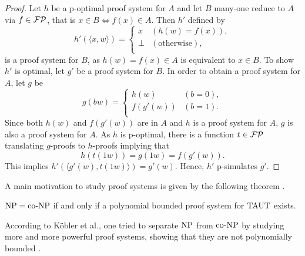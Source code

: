   \begin{proof}
    Let \(h\) be a p-optimal proof system for \(A\) and let \(B\) many-one reduce to \(A\) via \(f \in \mathcal{FP}\), that is \(x \in B \Leftrightarrow f(x) \in A\). Then \(h'\) defined by
      \[ 
        h'(\langle x, w \rangle) =
        \begin{cases}
          x & (h(w) = f(x)), \\
          \perp & (\text{otherwise}), \\
        \end{cases}
      \]
    is a proof system for \(B\), as \(h(w) = f(x) \in A\) is equivalent to \(x \in B\). To show \(h'\) is optimal, let \(g'\) be a proof system for \(B\). In order to obtain a proof system for \(A\), let \(g\) be
      \[
        g(bw) =
        \begin{cases}
          h(w) & (b = 0), \\
          f(g'(w)) & (b = 1). \\
        \end{cases}
      \]
    Since both \(h(w)\) and \(f(g'(w))\) are in \(A\) and \(h\) is a proof system for \(A\), \(g\) is also a proof system for \(A\). As \(h\) is p-optimal, there is a function \(t \in \mathcal{FP}\) translating \(g\)-proofs to \(h\)-proofs implying that
    \[
      h(t(1w)) = g(1w) = f(g'(w)).
    \]
    This implies \(h'(\langle g'(w), t(1w) \rangle ) = g'(w)\). Hence, \(h'\) p-simulates \(g'\).
  \end{proof}

  A main motivation to study proof systems is given by the following theorem \cite{KMT03}.

  \begin{theorem}
   \(\text{NP} = \text{co-NP}\) if and only if a polynomial bounded proof system for \(\text{TAUT}\) exists.
  \end{theorem}

  According to Köbler et al., one tried to separate \(\text{NP}\) from \(\text{co-NP}\) by studying more and more powerful proof systems, showing that they are not polynomially bounded \cite{KMT03}.





  